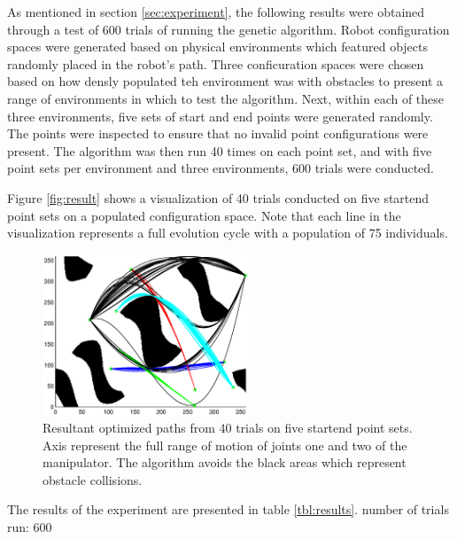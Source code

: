
As mentioned in section \ref{sec:experiment}, the following results were obtained through a test of 600 trials of running the genetic algorithm. Robot configuration spaces were generated based on physical environments which featured objects randomly placed in the robot's path. Three conficuration spaces were chosen based on how densly populated teh environment was with obstacles to present a range of environments in which to test the algorithm. Next, within each of these three environments, five sets of start and end points were generated randomly. The points were inspected to ensure that no invalid point configurations were present. The algorithm was then run 40 times on each point set, and with five point sets per environment and three environments, 600 trials were conducted.

Figure \ref{fig:result} shows a visualization of 40 trials conducted on five start\/end point sets on a populated configuration space. Note that each line in the visualization represents a full evolution cycle with a population of 75 individuals.

\begin{figure}[h] \label{fig:result}
	\centering
	\includegraphics[width=0.55\textwidth]{./figures/results_cSpace4.eps}
	\caption{Resultant optimized paths from 40 trials on five start\/end point sets. Axis represent the full range of motion of joints one and two of the manipulator. The algorithm avoids the black areas which represent obstacle collisions.}
	\label{fig:ws2cs}
\end{figure}

The results of the experiment are presented in table \ref{tbl:results}.
number of trials run: 600

